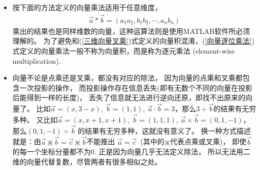 \begin{itemize}[leftmargin=\inteval{\myitemleftmargin}pt,itemsep=
   \inteval{\myitemitempsep}pt,topsep=\inteval{\myitemtopsep}pt]
\item 按下面的方法定义的向量乘法适用于任意维度，
\begin{gather}\label{向量逐位乘法}
    \vec{a}*\vec{b}=(a_1a_2,b_1b_2,\cdots,a_nb_n)
\end{gather}
乘出的结果也是同样维数的向量，这种运算法则是使用MATLAB软件所必须理解的。
为了避免和(\ref{三维向量叉乘})式定义的向量积混淆，(\ref{向量逐位乘法})
式定义的向量乘法一般不称为向量积，而是称为逐元乘法
(element-wise multiplication). 

\item 向量不论是点乘还是叉乘，都没有对应的除法，
因为向量的点乘和叉乘都包含一次投影的操作，
而投影操作存在信息丢失(即有无数个不同的向量在投影后能得到一样的长度)，
丢失了信息就无法进行逆向还原，即找不出原来的向量了。
比如$ \vec{a}=(x,3-x),\ \vec{b}=(1,1),\ 
\vec{a}\cdot \vec{b}=3 $，那么$ 3\div \vec{b} $的结果有无穷多种。
又比如$ \vec{a}=(x,x+1,x+1),\ \vec{b}=(1,1,1),\ 
\vec{a}\times\vec{b}=(0,1,-1) $，那么$ (0,1,-1) \div \vec{b} $
的结果有无穷多种，这就没有意义了。
换一种方式描述就是：由$ \vec{a}\divideontimes 
\vec{b}=\vec{c}\divideontimes \vec{b} $不能推出
$ \vec{a}=\vec{c} $\ (其中的$ \divideontimes $代表点乘或叉乘)，
即使$ \vec{b} $的每一个坐标分量都不为0. 正是因为向量几乎无法定义除法，
所以无法用二维的向量代替复数，尽管两者有很多相似之处。

\end{itemize}

